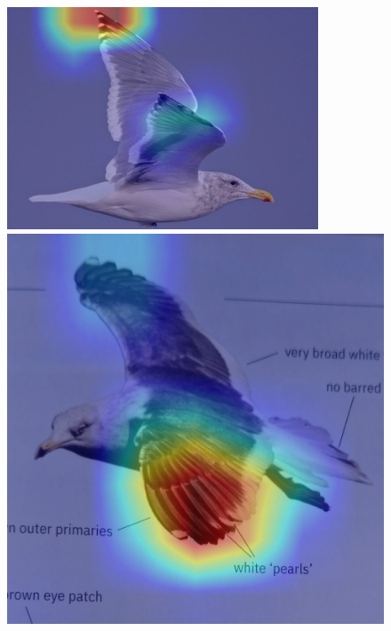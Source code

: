 \documentclass[a4paper,12pt]{report}
\begin{document}
\begin{figure}[htbp]
    \centering
    \begin{multicols}{6}
        \includegraphics[width=\linewidth]{images/interpretability/vgg/bird1.jpg}
        
        \includegraphics[width=\linewidth]{images/interpretability/vgg/bird2.jpg}
        

\end{multicols}
\end{figure}
\end{document}
